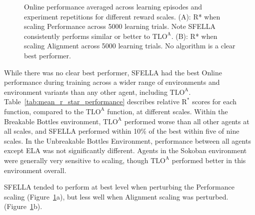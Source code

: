 \begin{figure}
  \caption{Online performance averaged across learning episodes and experiment repetitions for  different reward scales. (A): R* when scaling Performance across 5000 learning trials. Note SFELLA consistently performs similar or better to $\text{TLO}^\text{A}$. (B): R* when scaling Alignment across 5000 learning trials. No algorithm is a clear best performer.%
  }
   \label{fig:online_performance}
 \end{figure}

While there was no clear best performer, SFELLA had the best Online performance during training across a wider range of environments and environment variants than any other agent, including  $\text{TLO}^\text{A}$. Table~\ref{tab:mean_r_star_performance} describes relative $\text{R}^*$ scores for each function, compared to the $\text{TLO}^\text{A}$ function, at different scales.  Within the Breakable Bottles environment, $\text{TLO}^\text{A}$ performed worse than all other agents at all scales, and SFELLA performed within 10\% of the best within five of nine scales. In the Unbreakable Bottles Environment, performance between all agents except ELA was not significantly different. Agents in the Sokoban environment were generally very sensitive to scaling, though $\text{TLO}^\text{A}$ performed better in this environment overall. 



SFELLA tended to perform at best level when perturbing the Performance scaling (Figure~\ref{fig:online_performance}a), but less well when Alignment scaling was perturbed. (Figure~\ref{fig:online_performance}b).

